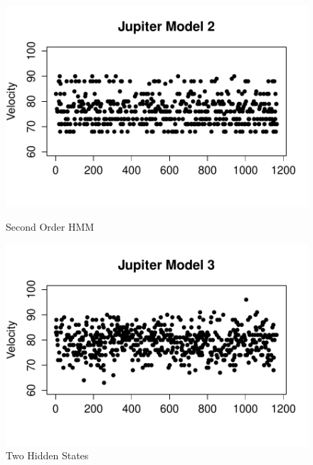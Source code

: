 \documentclass{article} %
\begin{document}
\begin{figure}[ht]
\begin{minipage}[b]{0.5\linewidth}
    \includegraphics[scale = 0.45]{JupiterModel2Velocity.pdf} 
    \caption{Second Order HMM\label{JV2}} 
    \vspace{4ex}
  \end{minipage}%
  \begin{minipage}[b]{0.5\linewidth}
    \centering
    \includegraphics[scale = 0.45]{JupiterModel3Velocity.pdf} 
    \caption{Two Hidden States\label{JV3}} 
    \vspace{4ex}
  \end{minipage} 
\end{figure}
\end{document}
